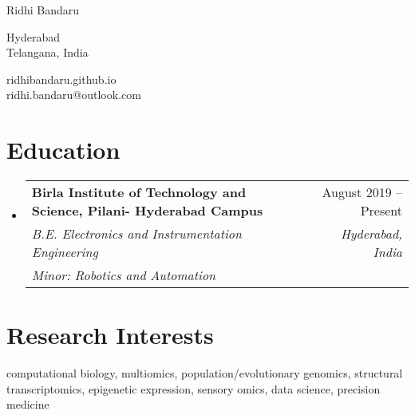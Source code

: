 \documentclass[letterpaper,11pt]{article}
\makeatletter
\newcommand{\resumeSubheadingNew}[6]{
  \vspace{-2pt}\item
    \begin{tabular*}{0.97\textwidth}[t]{l@{\extracolsep{\fill}}r}
      \textbf{#1} & #2 \\
      \textit{\small #3} & \textit{\small #4} \\
      \textit{\small #5} & \textit{\small #6} \\
    \end{tabular*}\vspace{-10pt}
}
\newcommand{\resumeSubHeadingListStart}{\begin{itemize}[leftmargin=0.15in, label={}]}
\newcommand{\resumeSubHeadingListEnd}{\end{itemize}}
\makeatother
\begin{document}
\begin{center}
    {\LARGE Ridhi Bandaru} \\ \vspace{0pt}
    \begin{multicols}{2}
    \begin{flushleft}
    \large{Hyderabad} \\
    \large{Telangana, India} \\
    \end{flushleft}
    
    \begin{flushright}
    \href{https://ridhibandaru.github.io/tldr.html} \large{ridhibandaru.github.io} \\
    \href{mailto:{ridhi.bandaru@outlook.com}} \large{ridhi.bandaru@outlook.com}
    \end{flushright}
    \end{multicols}
\end{center}


\section{Education}
\resumeSubHeadingListStart

    \resumeSubheadingNew
        {Birla Institute of Technology and Science, Pilani- Hyderabad Campus}{August 2019 -- Present}
        {B.E. Electronics and Instrumentation Engineering}{Hyderabad, India}
        {Minor: Robotics and Automation}{}

\resumeSubHeadingListEnd





\section{Research Interests}
\begin{itemize}[leftmargin=0.15in, label={}]
    \normalsize{\item{
     \textbf{}{computational biology, multiomics, population/evolutionary genomics, structural transcriptomics, epigenetic expression, sensory omics, data science, precision medicine} \\
    }}
 \end{itemize}
\end{document}
